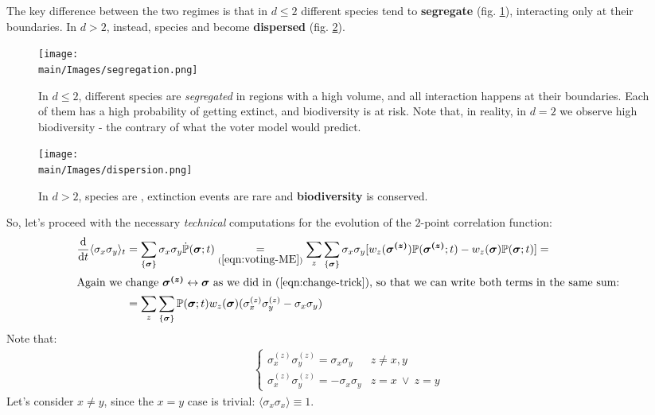 \documentclass[../../main.tex]{subfiles}
\begin{document}
\medskip

The key difference between the two regimes is that in $d \leq 2$ different species tend to \textbf{segregate} (fig. \ref{fig:segregation}), interacting only at their boundaries. In $d > 2$, instead, species  and become \textbf{dispersed} (fig. \ref{fig:dispersion}).     

\begin{figure}[H]
    \centering
    \texttt{[image: \\main/Images/segregation.png]}
    \caption{In $d \leq 2$, different species are \textit{segregated} in regions with a high volume, and all interaction happens at their boundaries. Each of them has a high probability of getting extinct, and biodiversity is at risk. Note that, in reality, in $d=2$ we observe high biodiversity - the contrary of what the voter model would predict.}
    \label{fig:segregation}
\end{figure}

\begin{figure}[H]
    \centering
    \texttt{[image: \\main/Images/dispersion.png]}
    \caption{In $d>2$, species are , extinction events are rare and \textbf{biodiversity} is conserved.}
    \label{fig:dispersion}
\end{figure}

So, let's proceed with the necessary \textit{technical}  computations for the evolution of the $2$-point correlation function:
\begin{align}\nonumber
    \dv{t} \langle \sigma_x \sigma_y \rangle_t &= \sum_{\{\bm{\sigma}\}} \sigma_x \sigma_y \dot{\mathbb{P}}(\bm{\sigma};t) \underset{(\ref{eqn:voting-ME})}{=} \sum_z \sum_{\{\bm{\sigma}\}} \sigma_x \sigma_y [ w_z(\bm{\sigma^{(z)}}) \mathbb{P}(\bm{\sigma^{(z)}};t)- w_z(\bm{\sigma}) \mathbb{P}(\bm{\sigma};t)] =\\
    \intertext{Again we change $\bm{\sigma^{(z)}} \leftrightarrow \bm{\sigma}$ as we did in (\ref{eqn:change-trick}), so that we can write both terms in the same sum:}
    &= \sum_z \sum_{\{\bm{\sigma}\}} \mathbb{P}(\bm{\sigma};t) w_z(\bm{\sigma}) (\sigma_x^{(z)} \sigma_y^{(z)} - \sigma_x \sigma_y) \label{eqn:dt2point2}
\end{align}
Note that:
\begin{align}\label{eqn:subs}
    \begin{cases}
        \sigma_x^{(z)} \sigma_y^{(z)} = \sigma_x \sigma_y & z \neq x,y\\
        \sigma_x^{(z)} \sigma_y^{(z)} = -\sigma_x \sigma_y & z = x \> \lor \> z = y
    \end{cases} 
\end{align}
Let's consider $x \neq y$, since the $x = y$ case is trivial: $\langle \sigma_x \sigma_x \rangle \equiv 1$.
\end{document}
